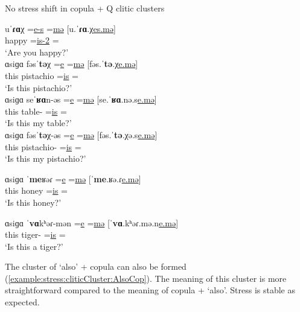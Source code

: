 \begin{exe}
	\ex No stress shift in copula + Q  clitic clusters \label{example:stress:cliticCluster:CopQ}
	\begin{xlist}
		\ex \gll uˈ\textbf{ɾɑ}χ =\underline{e-s} =\underline{mə} [u.ˈ\textbf{ɾɑ}.χ\underline{es.mə}]
		\\
		happy  =\underline{is-2{\sg}}  =\underline{{\q}}
		\\
		\trans `Are you happy?'
		\\
		\ex \gll ɑsiɡɑ fəsˈ\textbf{tə}χ =\underline{e} =\underline{mə} [fəs.ˈ\textbf{tə}.χ\underline{e.mə}]
		\\
		this pistachio  =\underline{is}  =\underline{{\q}}
		\\
		\trans `Is this pistachio?' 
		\\
		\ex \gll ɑsiɡɑ seˈ\textbf{ʁɑ}n-əs =\underline{e} =\underline{mə} [se.ˈ\textbf{ʁɑ}.nə.s\underline{e.mə}]
		\\
		this table-{\possFsg} =\underline{is}  =\underline{{\q}}
		\\
		\trans `Is this my table?' 
		\\
		\ex \gll ɑsiɡɑ fəsˈ\textbf{tə}χ-əs =\underline{e} =\underline{mə} [fəs.ˈ\textbf{tə}.χə.s\underline{e.mə}]
		\\
		this pistachio-{\possFsg}  =\underline{is}  =\underline{{\q}}
		\\
		\trans `Is this my pistachio?' 
		\\
		
		
		\ex \gll ɑsiɡɑ ˈ\textbf{me}ʁəɾ =\underline{e} =\underline{mə} [ˈ\textbf{me}.ʁə.ɾ\underline{e.mə}]
		\\
		this honey  =\underline{is} =\underline{{\q}}
		\\
		\trans `Is this honey?'
		\\
		
		\ex \gll ɑsiɡɑ ˈ\textbf{vɑ}kʰəɾ-mən =\underline{e} =\underline{mə} [ˈ\textbf{vɑ}.kʰəɾ.mə.n\underline{e.mə}]
		\\
		this tiger-{\indf}  =\underline{is} =\underline{{\q}}
		\\
		\trans `Is this a tiger?' 
		\\
	\end{xlist}
\end{exe}

The cluster of `also' + copula can also be formed (\ref{example:stress:cliticCluster:AlsoCop}). The meaning of this cluster is more straightforward compared to the meaning of   copula + `also'. Stress is stable as expected. 



